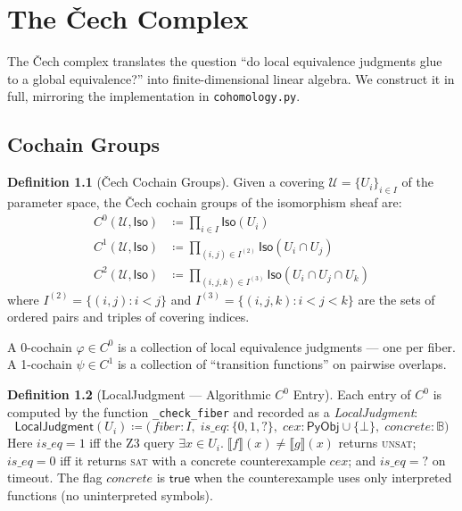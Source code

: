 \documentclass[11pt,a4paper]{report}
\theoremstyle{definition}
\newtheorem{definition}{Definition}[chapter]
\theoremstyle{plain}
\newcommand{\den}[1]{\llbracket #1 \rrbracket}
\newcommand{\Bool}{\mathbb{B}}
\newcommand{\PyObj}{\mathsf{PyObj}}
\newcommand{\covers}{\mathcal{U}}
\newcommand{\Iso}{\mathsf{Iso}}
\begin{document}
\chapter{The \v{C}ech Complex}
\label{ch:cech}

The \v{C}ech complex translates the question ``do local equivalence
judgments glue to a global equivalence?'' into finite-dimensional
linear algebra.  We construct it in full, mirroring the implementation
in \texttt{cohomology.py}.

\section{Cochain Groups}

\begin{definition}[\v{C}ech Cochain Groups]
\label{def:cech-cochain}
Given a covering $\covers = \{U_i\}_{i \in I}$ of the parameter space,
the \v{C}ech cochain groups of the isomorphism sheaf are:
\begin{align}
  C^0(\covers, \Iso) &\coloneqq \prod_{i \in I} \Iso(U_i) \\
  C^1(\covers, \Iso) &\coloneqq \prod_{(i,j) \in I^{(2)}} \Iso(U_i \cap U_j) \\
  C^2(\covers, \Iso) &\coloneqq \prod_{(i,j,k) \in I^{(3)}}
    \Iso(U_i \cap U_j \cap U_k)
\end{align}
where $I^{(2)} = \{(i,j) : i < j\}$ and
$I^{(3)} = \{(i,j,k) : i < j < k\}$ are the sets of ordered pairs
and triples of covering indices.
\end{definition}

A 0-cochain $\varphi \in C^0$ is a collection of local
equivalence judgments --- one per fiber.  A 1-cochain
$\psi \in C^1$ is a collection of ``transition functions'' on
pairwise overlaps.

\begin{definition}[LocalJudgment --- Algorithmic $C^0$ Entry]
\label{def:local-judgment}
Each entry of $C^0$ is computed by the function
\texttt{\_check\_fiber} and recorded as a \emph{LocalJudgment}:
\[
  \mathsf{LocalJudgment}(U_i) \coloneqq
  \bigl(\,\mathit{fiber} : I,\;
         \mathit{is\_eq} : \{0, 1, {?}\},\;
         \mathit{cex} : \PyObj \cup \{\bot\},\;
         \mathit{concrete} : \Bool
  \bigr)
\]
Here $\mathit{is\_eq} = 1$ iff the Z3 query
$\exists x \in U_i.\;\den{f}(x) \neq \den{g}(x)$ returns
\textsc{unsat}; $\mathit{is\_eq} = 0$ iff it returns \textsc{sat}
with a concrete counterexample $\mathit{cex}$; and
$\mathit{is\_eq} = {?}$ on timeout.  The flag $\mathit{concrete}$
is $\mathsf{true}$ when the counterexample uses only interpreted
functions (no uninterpreted symbols).
\end{definition}
\end{document}
